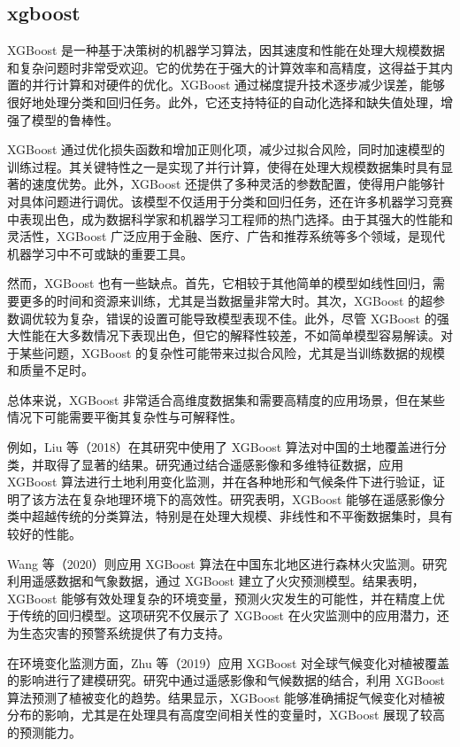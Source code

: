 \documentclass[AutoFakeBold]{LZUThesis-PgD&PhD}
\begin{document}
	
	
	\subsection{xgboost}
	XGBoost 是一种基于决策树的机器学习算法，因其速度和性能在处理大规模数据和复杂问题时非常受欢迎。它的优势在于强大的计算效率和高精度，这得益于其内置的并行计算和对硬件的优化。XGBoost 通过梯度提升技术逐步减少误差，能够很好地处理分类和回归任务。此外，它还支持特征的自动化选择和缺失值处理，增强了模型的鲁棒性。
	
	XGBoost 通过优化损失函数和增加正则化项，减少过拟合风险，同时加速模型的训练过程。其关键特性之一是实现了并行计算，使得在处理大规模数据集时具有显著的速度优势。此外，XGBoost 还提供了多种灵活的参数配置，使得用户能够针对具体问题进行调优。该模型不仅适用于分类和回归任务，还在许多机器学习竞赛中表现出色，成为数据科学家和机器学习工程师的热门选择。由于其强大的性能和灵活性，XGBoost 广泛应用于金融、医疗、广告和推荐系统等多个领域，是现代机器学习中不可或缺的重要工具。
	
	然而，XGBoost 也有一些缺点。首先，它相较于其他简单的模型如线性回归，需要更多的时间和资源来训练，尤其是当数据量非常大时。其次，XGBoost 的超参数调优较为复杂，错误的设置可能导致模型表现不佳。此外，尽管 XGBoost 的强大性能在大多数情况下表现出色，但它的解释性较差，不如简单模型容易解读。对于某些问题，XGBoost 的复杂性可能带来过拟合风险，尤其是当训练数据的规模和质量不足时。
	
	总体来说，XGBoost 非常适合高维度数据集和需要高精度的应用场景，但在某些情况下可能需要平衡其复杂性与可解释性。
	
	例如，Liu 等（2018）在其研究中使用了 XGBoost 算法对中国的土地覆盖进行分类，并取得了显著的结果\cite{liu2018}。研究通过结合遥感影像和多维特征数据，应用 XGBoost 算法进行土地利用变化监测，并在各种地形和气候条件下进行验证，证明了该方法在复杂地理环境下的高效性。研究表明，XGBoost 能够在遥感影像分类中超越传统的分类算法，特别是在处理大规模、非线性和不平衡数据集时，具有较好的性能。
	
	Wang 等（2020）则应用 XGBoost 算法在中国东北地区进行森林火灾监测\cite{wang2020Y}。研究利用遥感数据和气象数据，通过 XGBoost 建立了火灾预测模型。结果表明，XGBoost 能够有效处理复杂的环境变量，预测火灾发生的可能性，并在精度上优于传统的回归模型。这项研究不仅展示了 XGBoost 在火灾监测中的应用潜力，还为生态灾害的预警系统提供了有力支持。
	
	在环境变化监测方面，Zhu 等（2019）应用 XGBoost 对全球气候变化对植被覆盖的影响进行了建模研究\cite{zhu2019}。研究中通过遥感影像和气候数据的结合，利用 XGBoost 算法预测了植被变化的趋势。结果显示，XGBoost 能够准确捕捉气候变化对植被分布的影响，尤其是在处理具有高度空间相关性的变量时，XGBoost 展现了较高的预测能力。
	
\end{document}
